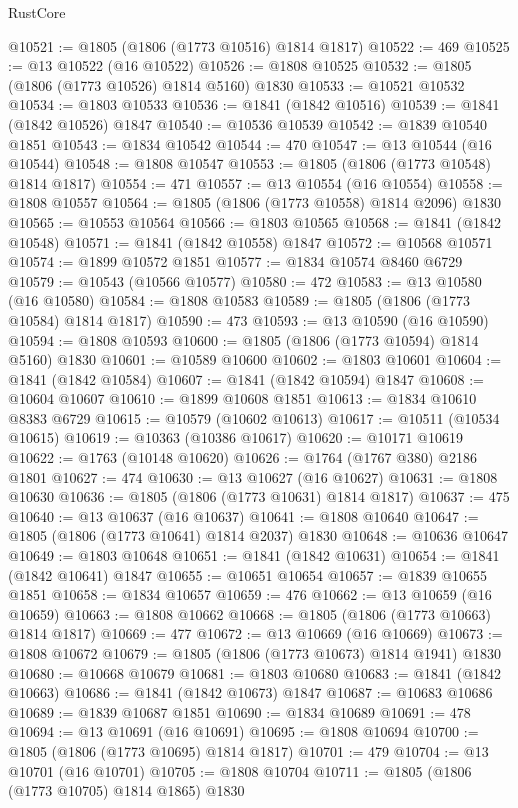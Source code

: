 \begin{lexlean}{RustCore}
\begin{coremodule}
@10521 := @1805 (@1806 (@1773 @10516) @1814 @1817)
@10522 := 469
@10525 := @13 @10522 (@16 @10522)
@10526 := @1808 @10525
@10532 := @1805 (@1806 (@1773 @10526) @1814 @5160) @1830
@10533 := @10521 @10532
@10534 := @1803 @10533
@10536 := @1841 (@1842 @10516)
@10539 := @1841 (@1842 @10526) @1847
@10540 := @10536 @10539
@10542 := @1839 @10540 @1851
@10543 := @1834 @10542
@10544 := 470
@10547 := @13 @10544 (@16 @10544)
@10548 := @1808 @10547
@10553 := @1805 (@1806 (@1773 @10548) @1814 @1817)
@10554 := 471
@10557 := @13 @10554 (@16 @10554)
@10558 := @1808 @10557
@10564 := @1805 (@1806 (@1773 @10558) @1814 @2096) @1830
@10565 := @10553 @10564
@10566 := @1803 @10565
@10568 := @1841 (@1842 @10548)
@10571 := @1841 (@1842 @10558) @1847
@10572 := @10568 @10571
@10574 := @1899 @10572 @1851
@10577 := @1834 @10574 @8460 @6729
@10579 := @10543 (@10566 @10577)
@10580 := 472
@10583 := @13 @10580 (@16 @10580)
@10584 := @1808 @10583
@10589 := @1805 (@1806 (@1773 @10584) @1814 @1817)
@10590 := 473
@10593 := @13 @10590 (@16 @10590)
@10594 := @1808 @10593
@10600 := @1805 (@1806 (@1773 @10594) @1814 @5160) @1830
@10601 := @10589 @10600
@10602 := @1803 @10601
@10604 := @1841 (@1842 @10584)
@10607 := @1841 (@1842 @10594) @1847
@10608 := @10604 @10607
@10610 := @1899 @10608 @1851
@10613 := @1834 @10610 @8383 @6729
@10615 := @10579 (@10602 @10613)
@10617 := @10511 (@10534 @10615)
@10619 := @10363 (@10386 @10617)
@10620 := @10171 @10619
@10622 := @1763 (@10148 @10620)
@10626 := @1764 (@1767 @380) @2186 @1801
@10627 := 474
@10630 := @13 @10627 (@16 @10627)
@10631 := @1808 @10630
@10636 := @1805 (@1806 (@1773 @10631) @1814 @1817)
@10637 := 475
@10640 := @13 @10637 (@16 @10637)
@10641 := @1808 @10640
@10647 := @1805 (@1806 (@1773 @10641) @1814 @2037) @1830
@10648 := @10636 @10647
@10649 := @1803 @10648
@10651 := @1841 (@1842 @10631)
@10654 := @1841 (@1842 @10641) @1847
@10655 := @10651 @10654
@10657 := @1839 @10655 @1851
@10658 := @1834 @10657
@10659 := 476
@10662 := @13 @10659 (@16 @10659)
@10663 := @1808 @10662
@10668 := @1805 (@1806 (@1773 @10663) @1814 @1817)
@10669 := 477
@10672 := @13 @10669 (@16 @10669)
@10673 := @1808 @10672
@10679 := @1805 (@1806 (@1773 @10673) @1814 @1941) @1830
@10680 := @10668 @10679
@10681 := @1803 @10680
@10683 := @1841 (@1842 @10663)
@10686 := @1841 (@1842 @10673) @1847
@10687 := @10683 @10686
@10689 := @1839 @10687 @1851
@10690 := @1834 @10689
@10691 := 478
@10694 := @13 @10691 (@16 @10691)
@10695 := @1808 @10694
@10700 := @1805 (@1806 (@1773 @10695) @1814 @1817)
@10701 := 479
@10704 := @13 @10701 (@16 @10701)
@10705 := @1808 @10704
@10711 := @1805 (@1806 (@1773 @10705) @1814 @1865) @1830

\end{coremodule}
\end{lexlean}
